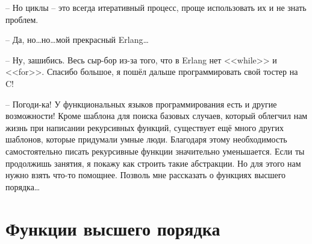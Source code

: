 \documentclass[a4paper,12pt]{report}
\begin{document}
\--- Но циклы \--- это всегда итеративный процесс, проще использовать их и не знать проблем.

\--- Да, но\ldots но\ldots мой прекрасный Erlang\ldots

\--- Ну, зашибись. Весь сыр\--бор из\--за того, что в Erlang нет <<while>> и <<for>>. Спасибо большое, я пошёл дальше программировать свой тостер на C!

\--- Погоди\--ка! У функциональных языков программирования есть и другие возможности! Кроме шаблона для поиска базовых случаев, который облегчил нам жизнь при написании рекурсивных функций, существует ещё много других шаблонов, которые придумали умные люди. Благодаря этому необходимость самостоятельно писать рекурсивные функции значительно уменьшается. Если ты продолжишь занятия, я покажу как строить такие абстракции. Но для этого нам нужно взять что\--то помощнее. Позволь мне рассказать о функциях высшего порядка\ldots
\chapter{Функции высшего порядка}
\end{document}
